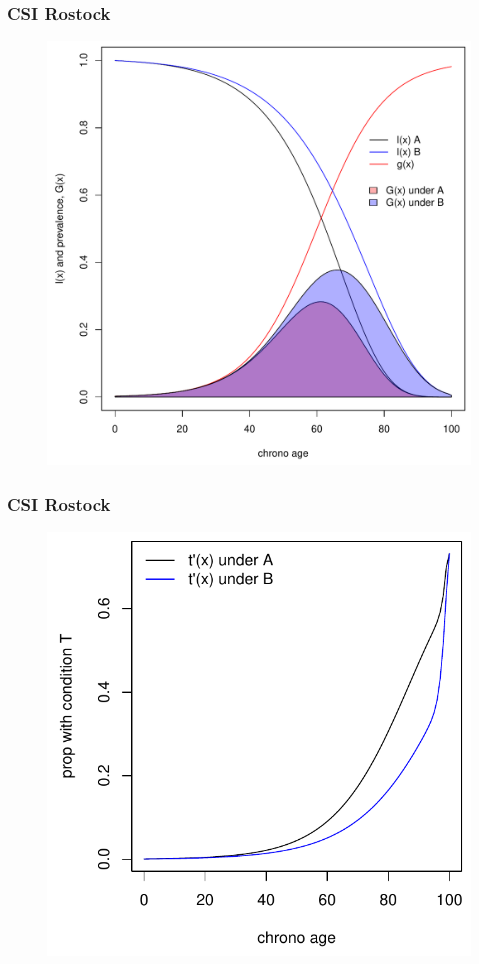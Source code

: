 \documentclass[20pt]{beamer}
\begin{document}
\begin{frame}
\frametitle{CSI Rostock}
\begin{figure}[b]
    \centering
    \includegraphics[scale=.9]{Figures/LabPres/Z4GxAB.pdf}
\end{figure} 
\end{frame}

\begin{frame}
\frametitle{CSI Rostock}
\begin{figure}[b]
    \centering
    \includegraphics[scale=1.2]{Figures/LabPres/Z5txAtxB.pdf}
\end{figure} 
\end{frame}
\end{document}

